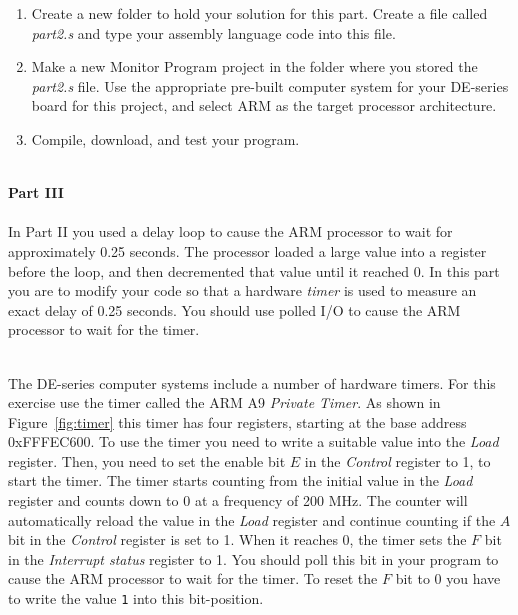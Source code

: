 \documentclass[epsfig,10pt,fullpage]{article}
\begin{document}
\begin{enumerate}
\item Create a new folder to hold your solution for this part. Create a
file called {\it part2.s} and type your assembly language code into this file.

\item
Make a new Monitor Program project in the folder where you stored the {\it part2.s}
file. Use the appropriate pre-built computer system for your DE-series board for this project, 
and select ARM as the target processor architecture.

\item
Compile, download, and test your program. 
\end{enumerate}

~\\
\noindent
{\bf Part III}
~\\
~\\
\noindent
In Part II you used a delay loop to cause the ARM processor to wait for approximately 0.25 
seconds. The processor loaded a large value into a register before the loop, and then 
decremented that value until it reached 0.  In this part you are to modify your code so that a
hardware {\it timer} is used to measure an exact delay of 0.25 seconds. 
You should use polled I/O to
cause the ARM processor to wait for the timer.

~\\
\noindent
The DE-series computer systems include a number of hardware timers. For this exercise use the timer
called the ARM A9 {\it Private Timer}. As shown in Figure~\ref{fig:timer} this timer has 
four registers, starting at the base address {\sf 0xFFFEC600}. To use the timer you need
to write a suitable value into the {\it Load} register. Then, you need to set the enable
bit $E$ in the {\it Control} register to 1, to start the timer. The timer starts counting from
the initial value in the {\it Load} register and counts down to 0 at a frequency of 200 MHz. 
The counter will automatically reload the value in the {\it Load} register and continue counting 
if the $A$ bit in the {\it Control} register is set to 1.  When it reaches 0, the timer sets 
the $F$ bit in the {\it Interrupt status} register to 1.
You should poll this bit in your program to cause the ARM processor to wait for the timer. 
To reset the $F$ bit to 0 you have to write the value \texttt{1} into this bit-position. 
\end{document}
